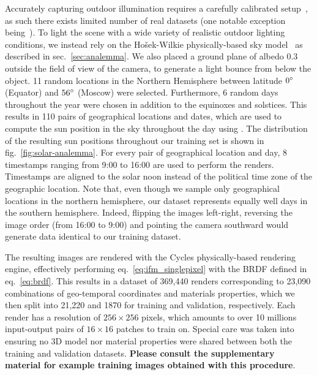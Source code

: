 Accurately capturing outdoor illumination requires a carefully calibrated setup~\cite{stumpfel-afrigraph-04}, as such there exists limited number of real datasets (one notable exception being~\cite{hdrdb}). To light the scene with a wide variety of realistic outdoor lighting conditions, we instead rely on the Ho\v{s}ek-Wilkie physically-based sky model~\cite{hosek-tog-12} as described in sec.~\ref{sec:analemma}. We also placed a ground plane of albedo 0.3 outside the field of view of the camera, to generate a light bounce from below the object. 11 random locations in the Northern Hemisphere between latitude $0^{\circ}$ (Equator) and $56^{\circ}$ (Moscow) were selected. Furthermore, 6 random days throughout the year were chosen in addition to the equinoxes and solstices. This results in 110 pairs of geographical locations and dates, which are used to compute the sun position in the sky throughout the day using \cite{bretagnon-aaa-88}. The distribution of the resulting sun positions throughout our training set is shown in fig.~\ref{fig:solar-analemma}. For every pair of geographical location and day, 8 timestamps ranging from 9:00 to 16:00 are used to perform the renders. Timestamps are aligned to the solar noon instead of the political time zone of the geographic location. Note that, even though we sample only geographical locations in the northern hemisphere, our dataset represents equally well days in the southern hemisphere. Indeed, flipping the images left-right, reversing the image order (from 16:00 to 9:00) and pointing the camera southward would generate data identical to our training dataset.

The resulting images are rendered with the Cycles physically-based rendering engine, effectively performing eq.~\eqref{eq:ifm_singlepixel} with the BRDF defined in eq.~\eqref{eq:brdf}. This results in a dataset of 369,440 renders corresponding to 23,090 combinations of geo-temporal coordinates and materials properties, which we then split into 21,220 and 1870 for training and validation, respectively. Each render has a resolution of $256 \times 256$ pixels, which amounts to over 10 millions input-output pairs of $16 \times 16$ patches to train on. Special care was taken into ensuring no 3D model nor material properties were shared between both the training and validation datasets. \textbf{Please consult the supplementary material for example training images obtained with this procedure}. 

